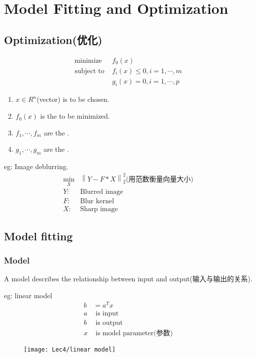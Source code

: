 \chapter{Model Fitting and Optimization}
\section{Optimization(优化)}
\begin{align*}
    \text{minimize }& f_0(x)\\
    \text{subject to }&f_i(x)\le 0 ,i=1,\cdots ,m\\
    &g_i(x)=0, i=1,\cdots ,p
\end{align*}
\begin{enumerate}
    \item $x\in R^n$(vector) is  to be chosen. 
    \item $f_0(x)$ is the  to be minimized.
    \item $f_1,\cdots,f_m$ are the .
    \item $g_1,\cdots,g_m$ are the .
\end{enumerate}

eg: Image deblurring.
\begin{align*}
    \min_{X}& \left\| Y-F*X \right\|_{2}^{2} \text{(用范数衡量向量大小)}\\
    Y: &\text{Blurred image}\\
    F: &\text{Blur kernel}\\
    X: &\text{Sharp image}
\end{align*}

\section{Model fitting}
\subsection{Model}
A model describes the relationship between input and output(输入与输出的关系).

eg: linear model
\begin{align*}
    b&=a^Tx\\
    a& \text{ is input}\\
    b& \text{ is output}\\
    x& \text{ is model parameter(参数)}
\end{align*}
\begin{figure}[H]
    \centering
    \texttt{[image: Lec4/linear model]}
\end{figure}
